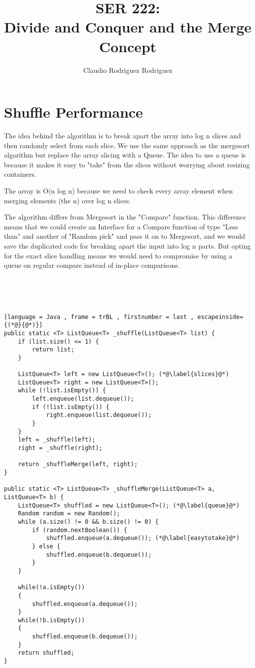 \documentclass{article}
\begin{document}
\title{SER 222:\\Divide and Conquer and the Merge Concept}
\author{Claudio Rodriguez Rodriguez}
\maketitle

\section{Shuffle Performance}

The idea behind the algorithm is to break apart the array into log n slices and then randomly select from each slice. We use the same approach as the mergesort algorithm but replace the array slicing with a Queue. The idea to use a queue is because it makes it easy to "take" from the slices without worrying about resizing containers.

The array is O(n log n) because we need to check every array element when merging elements (the n) over log n slices.  

The algorithm differs from Mergesort in the "Compare" function. This difference means that we could create an Interface for a Compare function of type "Less than" and another of "Random pick" and pass it on to Mergesort, and we would save the duplicated code for breaking apart the input into log n parts. But opting for the exact slice handling means we would need to compromise by using a queue on regular compare instead of in-place comparisons.

\ \\ 
\ \\ 
\ \\ 

\begin{lstlisting}[language = Java , frame = trBL , firstnumber = last , escapeinside={(*@}{@*)}]
public static <T> ListQueue<T> _shuffle(ListQueue<T> list) {
    if (list.size() <= 1) {
        return list;
    }

    ListQueue<T> left = new ListQueue<T>(); (*@\label{slices}@*)
    ListQueue<T> right = new ListQueue<T>();
    while (!list.isEmpty()) {
        left.enqueue(list.dequeue());
        if (!list.isEmpty()) {
            right.enqueue(list.dequeue());
        }
    }
    left = _shuffle(left);
    right = _shuffle(right);

    return _shuffleMerge(left, right);
}

public static <T> ListQueue<T> _shuffleMerge(ListQueue<T> a, ListQueue<T> b) {
    ListQueue<T> shuffled = new ListQueue<T>(); (*@\label{queue}@*)
    Random random = new Random();
    while (a.size() != 0 && b.size() != 0) {
        if (random.nextBoolean()) {
            shuffled.enqueue(a.dequeue()); (*@\label{easytotake}@*)
        } else {
            shuffled.enqueue(b.dequeue()); 
        }
    }

    while(!a.isEmpty())
    {
        shuffled.enqueue(a.dequeue());
    }
    while(!b.isEmpty())
    {
        shuffled.enqueue(b.dequeue());
    }
    return shuffled;
}
\end{lstlisting}
\end{document}
